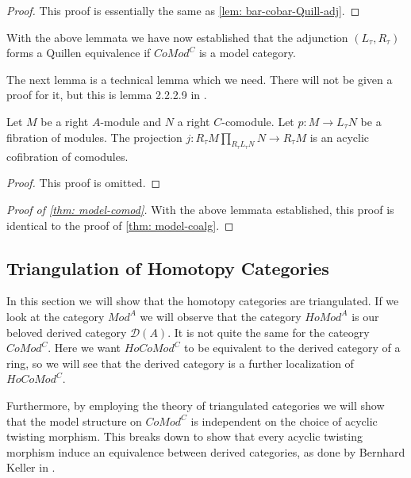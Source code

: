 \documentclass[../thesis.tex]{subfiles}
\begin{document}
            \begin{proof}
                This proof is essentially the same as \ref{lem: bar-cobar-Quill-adj}.
            \end{proof}

            With the above lemmata we have now established that the adjunction $(L_\tau, R_\tau)$ forms a Quillen equivalence if $CoMod^C$ is a model category.

            The next lemma is a technical lemma which we need. There will not be given a proof for it, but this is lemma 2.2.2.9 in \cite{LefevreHasegawa03}.

            \begin{lemma}
                Let $M$ be a right $A$-module and $N$ a right $C$-comodule. Let $p : M \rightarrow L_\tau N$ be a fibration of modules. The projection $j : R_\tau M \prod_{R_\tau L_\tau N} N \rightarrow R_\tau M$ is an acyclic cofibration of comodules.
            \end{lemma}

            \begin{proof}
                This proof is omitted.
            \end{proof}

            \begin{proof}[Proof of \ref{thm: model-comod}]
                With the above lemmata established, this proof is identical to the proof of \ref{thm: model-coalg}.
            \end{proof}

        \subsection{Triangulation of Homotopy Categories}
            In this section we will show that the homotopy categories are triangulated. If we look at the category $Mod^A$ we will observe that the category $HoMod^A$ is our beloved derived category $\mathcal{D}(A)$. It is not quite the same for the cateogry $CoMod^C$. Here we want $HoCoMod^C$ to be equivalent to the derived category of a ring, so we will see that the derived category is a further localization of $HoCoMod^C$.

            Furthermore, by employing the theory of triangulated categories we will show that the model structure on $CoMod^C$ is independent on the choice of acyclic twisting morphism. This breaks down to show that every acyclic twisting morphism induce an equivalence between derived categories, as done by Bernhard Keller in \cite{Keller94}.
\end{document}
